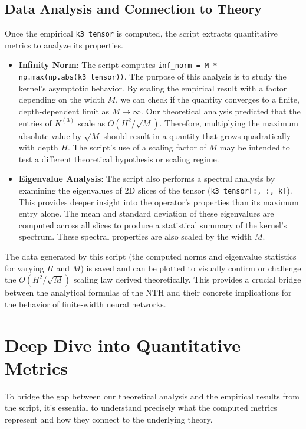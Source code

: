 \documentclass[a4paper]{article}
\begin{document}
\subsection{Data Analysis and Connection to Theory}

Once the empirical \texttt{k3\_tensor} is computed, the script extracts quantitative metrics to analyze its properties.

\begin{itemize}
    \item \textbf{Infinity Norm}: The script computes \texttt{inf\_norm = M * np.max(np.abs(k3\_tensor))}. The purpose of this analysis is to study the kernel's asymptotic behavior. By scaling the empirical result with a factor depending on the width $M$, we can check if the quantity converges to a finite, depth-dependent limit as $M \to \infty$. Our theoretical analysis predicted that the entries of $K^{(3)}$ scale as $O(H^2/\sqrt{M})$. Therefore, multiplying the maximum absolute value by $\sqrt{M}$ should result in a quantity that grows quadratically with depth $H$. The script's use of a scaling factor of $M$ may be intended to test a different theoretical hypothesis or scaling regime.

    \item \textbf{Eigenvalue Analysis}: The script also performs a spectral analysis by examining the eigenvalues of 2D slices of the tensor (\texttt{k3\_tensor[:, :, k]}). This provides deeper insight into the operator's properties than its maximum entry alone. The mean and standard deviation of these eigenvalues are computed across all slices to produce a statistical summary of the kernel's spectrum. These spectral properties are also scaled by the width $M$.
\end{itemize}

The data generated by this script (the computed norms and eigenvalue statistics for varying $H$ and $M$) is saved and can be plotted to visually confirm or challenge the $O(H^2/\sqrt{M})$ scaling law derived theoretically. This provides a crucial bridge between the analytical formulas of the NTH and their concrete implications for the behavior of finite-width neural networks.

\newpage

\section{Deep Dive into Quantitative Metrics}

To bridge the gap between our theoretical analysis and the empirical results from the script, it's essential to understand precisely what the computed metrics represent and how they connect to the underlying theory.
\end{document}
